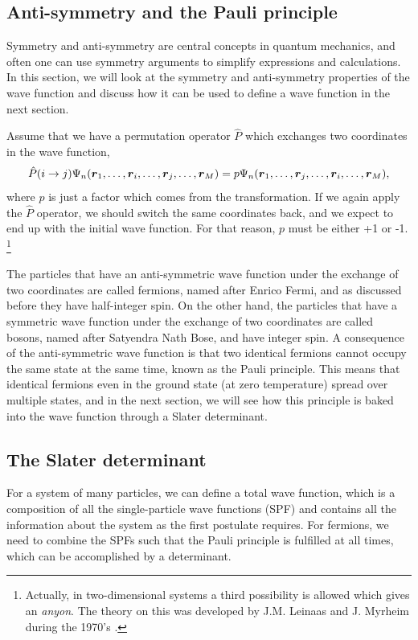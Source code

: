 \subsection{Anti-symmetry and the Pauli principle} \label{sec:symmetry}
Symmetry and anti-symmetry are central concepts in quantum mechanics, and often one can use symmetry arguments to simplify expressions and calculations. In this section, we will look at the symmetry and anti-symmetry properties of the wave function and discuss how it can be used to define a wave function in the next section.

Assume that we have a permutation operator $\hat{P}$ which exchanges two coordinates in the wave function,
\begin{equation}
\hat{P}(i\rightarrow j)\Psi_n(\boldsymbol{{r}}_1,\hdots,\boldsymbol{{r}}_i,\hdots,\boldsymbol{{r}}_j,\hdots,\boldsymbol{{r}}_M)=p\Psi_n(\boldsymbol{{r}}_1,\hdots,\boldsymbol{{r}}_j,\hdots,\boldsymbol{{r}}_i,\hdots,\boldsymbol{{r}}_M),
\end{equation}
where $p$ is just a factor which comes from the transformation. If we again apply the $\hat{P}$ operator, we should switch the same coordinates back, and we expect to end up with the initial wave function. For that reason, $p$ must be either +1 or -1. \footnote{Actually, in two-dimensional systems a third possibility is allowed which gives an \textit{anyon}. The theory on this was developed by J.M. Leinaas and J. Myrheim during the 1970's \cite{leinaas_one_1977}.}

The particles that have an anti-symmetric wave function under the exchange of two coordinates are called fermions, named after Enrico Fermi, and as discussed before they have half-integer spin. On the other hand, the particles that have a symmetric wave function under the exchange of two coordinates are called bosons, named after Satyendra Nath Bose, and have integer spin. A consequence of the anti-symmetric wave function is that two identical fermions cannot occupy the same state at the same time, known as the Pauli principle. This means that identical fermions even in the ground state (at zero temperature) spread over multiple states, and in the next section, we will see how this principle is baked into the wave function through a Slater determinant. 

\subsection{The Slater determinant} \label{sec:slater}
For a system of many particles, we can define a total wave function, which is a composition of all the single-particle wave functions (SPF) and contains all the information about the system as the first postulate requires. For fermions, we need to combine the SPFs such that the Pauli principle is fulfilled at all times, which can be accomplished by a determinant. 

